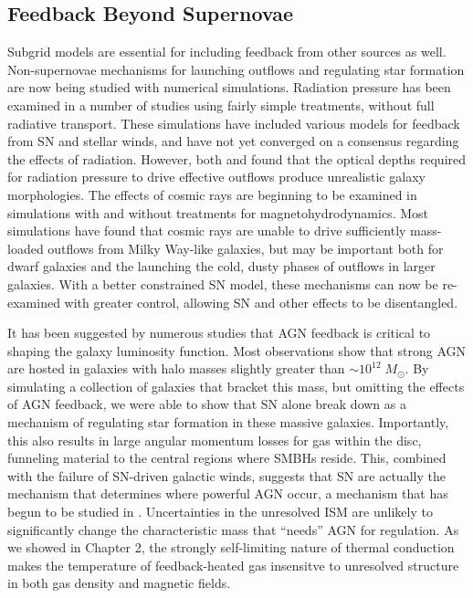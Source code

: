 \subsection{Feedback Beyond Supernovae}
Subgrid models are essential for including feedback from other sources as well.
Non-supernovae mechanisms for launching outflows and regulating star formation
are now being studied with numerical simulations.  Radiation pressure has been
examined in a number of studies \citep{Hopkins2014,Roskar2014,Agertz2015} using
fairly simple treatments, without full radiative transport.  These simulations
have included various models for feedback from SN and stellar winds, and have
not yet converged on a consensus regarding the effects of radiation.  However,
both \citet{Roskar2014} and \citet{Agertz2015} found that the optical depths
required for radiation pressure to drive effective outflows produce unrealistic
galaxy morphologies.  The effects of cosmic rays are beginning to be examined in
simulations with \citep{Girichidis2015} and without
\citep{Jubelgas2008,Booth2013} treatments for magnetohydrodynamics.  Most
simulations have found that cosmic rays are unable to drive sufficiently
mass-loaded outflows from Milky Way-like galaxies, but may be important both for
dwarf galaxies and the launching the cold, dusty phases of outflows in larger
galaxies.  With a better constrained SN model, these mechanisms can now be
re-examined with greater control, allowing SN and other effects to be
disentangled.

It has been suggested by numerous studies \citep{Benson2003,Bower2006} that AGN
feedback is critical to shaping the galaxy luminosity function.  Most
observations \citep{Kauffmann2003b} show that strong AGN are hosted in galaxies
with halo masses slightly greater than $\sim10^{12}\;M_\odot$.  By simulating a
collection of galaxies that bracket this mass, but omitting the effects of AGN
feedback, we were able to show that SN alone break down as a mechanism of
regulating star formation in these massive galaxies.  Importantly, this also
results in large angular momentum losses for gas within the disc, funneling
material to the central regions where SMBHs reside.  This, combined with the
failure of SN-driven galactic winds, suggests that SN are actually the mechanism
that determines where powerful AGN occur, a mechanism that has begun to be studied in
\citet{Bower2016}.  Uncertainties in the unresolved ISM are unlikely to
significantly change the characteristic mass that ``needs'' AGN for regulation.
As we showed in Chapter 2, the strongly self-limiting nature of thermal
conduction makes the temperature of feedback-heated gas insensitve to unresolved
structure in both gas density and magnetic fields.

